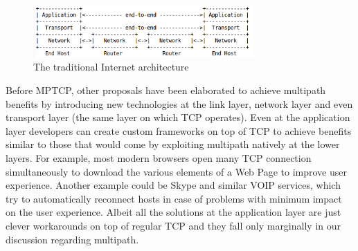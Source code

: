 \begin{figure}[!htb]
\centering
\includegraphics[width=0.75\textwidth]{images/OSI}
\caption{The traditional Internet architecture}
\label{fig:OSI}
\end{figure}

Before MPTCP, other proposals have been elaborated to achieve multipath benefits by introducing new technologies at the link layer, network layer and even transport layer (the same layer on which TCP operates). Even at the application layer developers can create custom frameworks on top of TCP to achieve benefits similar to those that would come by exploiting multipath natively at the lower layers. For example, most modern browsers open many TCP connection simultaneously to download the various elements of a Web Page to improve user experience. Another example could be Skype and similar VOIP services, which try to automatically reconnect hosts in case of problems with minimum impact on the user experience. Albeit all the solutions at the application layer are just clever workarounds on top of regular TCP and they fall only marginally in our discussion regarding multipath.

